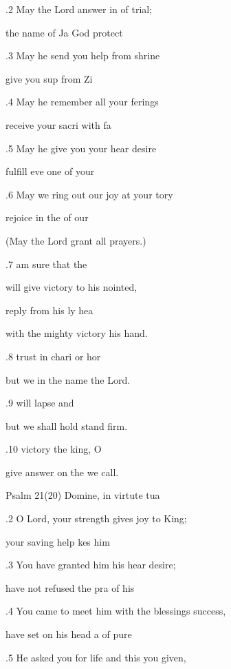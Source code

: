 .2 May the Lord answer in  of trial; 

 the name of Ja God protect  

.3 May he send you help from  shrine 

 give you sup from Zi 

.4 May he remember all your ferings 

 receive your sacri with fa 

.5 May he give you your hear desire 

 fulfill eve one of your  

.6 May we ring out our joy at your tory 

 rejoice in the  of our  

(May the Lord grant all  prayers.) 

.7  am sure  that the  

will give victory to his nointed, 

 reply from his ly hea 

with the mighty victory  his hand. 

.8  trust in chari or hor 

but we in the name  the Lord. 

.9  will lapse and  

but we shall hold  stand firm. 

.10  victory  the king, O  

give answer on the  we call. 

Psalm 21(20) Domine, in virtute tua 


.2 O Lord, your strength gives joy to  King; 

 your saving help kes him  

.3 You have granted him his hear desire; 

 have not refused the pra of his  

.4 You came to meet him with the blessings  success, 

 have set on his head a  of pure  

.5 He asked you for life and this you  given, 

